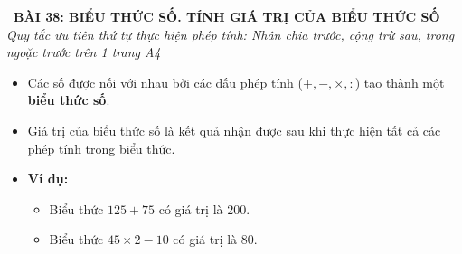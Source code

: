 \documentclass[11pt,a4paper]{article}
\begin{document}
\begin{tcolorbox}[
  enhanced,
  colback=white,
  colframe=primary,
  arc=3mm,
  boxrule=1.2pt,
  left=4mm, right=4mm, top=2.5mm, bottom=2.5mm,
  drop shadow=black!10!white
]
  \centering
  {\Large\bfseries\color{primary}\faBookmark\ BÀI 38: BIỂU THỨC SỐ. TÍNH GIÁ TRỊ CỦA BIỂU THỨC SỐ}\\[1.5mm]
  {\small\itshape\color{black!75}Quy tắc ưu tiên thứ tự thực hiện phép tính: Nhân chia trước, cộng trừ sau, trong ngoặc trước trên 1 trang A4}
\end{tcolorbox}

\vspace{-2mm}


\noindent
\begin{minipage}[t]{0.49\textwidth}\vspace{0pt}
\begin{tcolorbox}[
  enhanced,
  colback=blue!4!white,
  colframe=blue!75!black,
  arc=2mm, boxrule=0.8pt,
  left=2mm, right=2mm, top=1.8mm, bottom=1.8mm,
  title={\footnotesize\bfseries\color{white}\faKey\ 1. Khái niệm Biểu thức số}
]
{\footnotesize
\begin{itemize}\setlength{\itemsep}{1.5pt}\setlength{\leftskip}{-2.5mm}
  \item Các số được nối với nhau bởi các dấu phép tính ($+, -, \times, :$) tạo thành một \textbf{biểu thức số}.
  \item Giá trị của biểu thức số là kết quả nhận được sau khi thực hiện tất cả các phép tính trong biểu thức.
  \item \textbf{Ví dụ:}
  \begin{itemize}\setlength{\itemsep}{0.5pt}\setlength{\leftskip}{-2.5mm}
    \item Biểu thức $125 + 75$ có giá trị là $200$.
    \item Biểu thức $45 \times 2 - 10$ có giá trị là $80$.
  \end{itemize}
\end{itemize}
}
\end{tcolorbox}
\end{minipage}
\hfill
\end{document}
